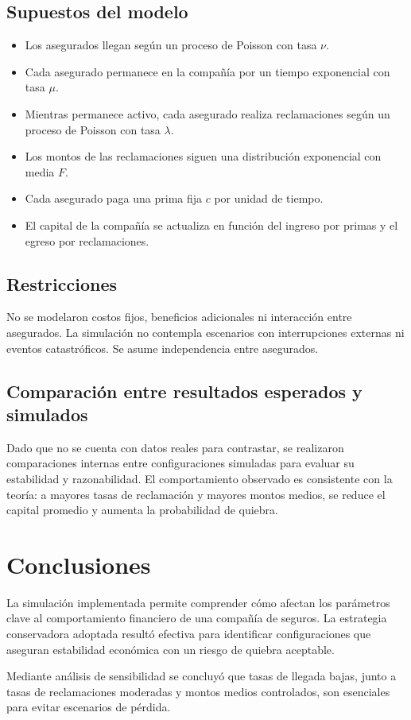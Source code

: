 \documentclass[12pt]{article}
\begin{document}
\subsection*{Supuestos del modelo}
\begin{itemize}
    \item Los asegurados llegan según un proceso de Poisson con tasa $\nu$.
    \item Cada asegurado permanece en la compañía por un tiempo exponencial con tasa $\mu$.
    \item Mientras permanece activo, cada asegurado realiza reclamaciones según un proceso de Poisson con tasa $\lambda$.
    \item Los montos de las reclamaciones siguen una distribución exponencial con media $F$.
    \item Cada asegurado paga una prima fija $c$ por unidad de tiempo.
    \item El capital de la compañía se actualiza en función del ingreso por primas y el egreso por reclamaciones.
\end{itemize}

\subsection*{Restricciones}

No se modelaron costos fijos, beneficios adicionales ni interacción entre asegurados. La simulación no contempla escenarios con interrupciones externas ni eventos catastróficos. Se asume independencia entre asegurados.

\subsection*{Comparación entre resultados esperados y simulados}

Dado que no se cuenta con datos reales para contrastar, se realizaron comparaciones internas entre configuraciones simuladas para evaluar su estabilidad y razonabilidad. El comportamiento observado es consistente con la teoría: a mayores tasas de reclamación y mayores montos medios, se reduce el capital promedio y aumenta la probabilidad de quiebra.

\section{Conclusiones}

La simulación implementada permite comprender cómo afectan los parámetros clave al comportamiento financiero de una compañía de seguros. La estrategia conservadora adoptada resultó efectiva para identificar configuraciones que aseguran estabilidad económica con un riesgo de quiebra aceptable.

Mediante análisis de sensibilidad se concluyó que tasas de llegada bajas, junto a tasas de reclamaciones moderadas y montos medios controlados, son esenciales para evitar escenarios de pérdida.
\end{document}
